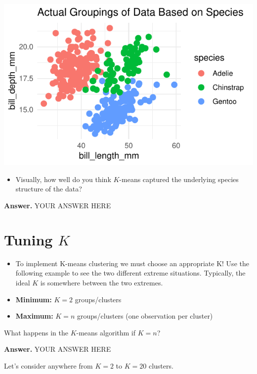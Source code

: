 \documentclass[
  letterpaper,
  DIV=11,
  numbers=noendperiod]{scrartcl}
\providecommand{\tightlist}{%
  \setlength{\itemsep}{0pt}\setlength{\parskip}{0pt}}\usepackage{longtable,booktabs,array}
\begin{document}
\begin{center}
\includegraphics{K-Means-Mini-Demo_files/figure-pdf/unnamed-chunk-7-1.pdf}
\end{center}

\begin{itemize}
\tightlist
\item
  Visually, how well do you think \(K\)-means captured the underlying
  species structure of the data?
\end{itemize}

\textbf{Answer.} YOUR ANSWER HERE

\section{\texorpdfstring{Tuning \(K\)}{Tuning K}}\label{tuning-k}

\begin{itemize}
\item
  To implement K-means clustering we must choose an appropriate K! Use
  the following example to see the two different extreme situations.
  Typically, the ideal \(K\) is somewhere between the two extremes.
\item
  \textbf{Minimum:} \(K = 2\) groups/clusters
\item
  \textbf{Maximum:} \(K = n\) groups/clusters (one observation per
  cluster)
\end{itemize}

What happens in the \(K\)-means algorithm if \(K = n\)?

\textbf{Answer.} YOUR ANSWER HERE

Let's consider anywhere from \(K = 2\) to \(K = 20\) clusters.
\end{document}
